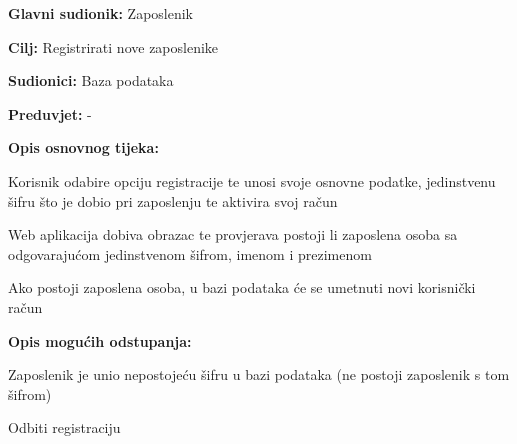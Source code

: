 				
				\noindent {}
				\begin{packed_item}
					
					\item \textbf{Glavni sudionik:} Zaposlenik
					\item  \textbf{Cilj:} Registrirati nove zaposlenike
					\item  \textbf{Sudionici:} Baza podataka
					\item  \textbf{Preduvjet:} -
					\item  \textbf{Opis osnovnog tijeka:}
					
					\item[] \begin{packed_enum}
						
						\item Korisnik odabire opciju registracije te unosi svoje osnovne podatke, jedinstvenu šifru što je dobio pri zaposlenju te aktivira svoj račun
						\item Web aplikacija dobiva obrazac te provjerava postoji li zaposlena osoba sa odgovarajućom jedinstvenom šifrom, imenom i prezimenom
						\item Ako postoji zaposlena osoba, u bazi podataka će se umetnuti novi korisnički račun 
						
					\end{packed_enum}
				
					\item  \textbf{Opis mogućih odstupanja:}
					
					\item[] \begin{packed_item}
						
						\item[1.] Zaposlenik je unio nepostojeću šifru u bazi podataka (ne postoji zaposlenik s tom šifrom)
						
						\item[] \begin{packed_enum}
							
							\item Odbiti registraciju
							
						\end{packed_enum}
						
					\end{packed_item}
					
				\end{packed_item}
				
